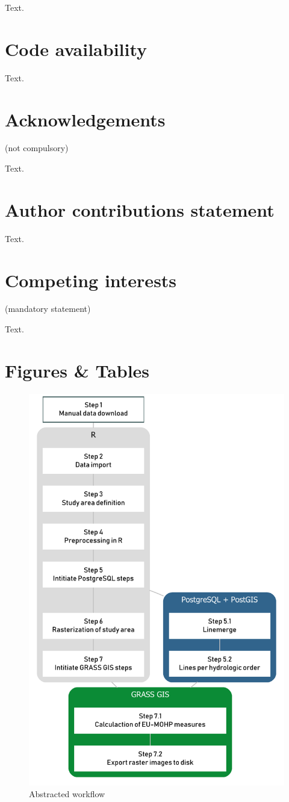 \documentclass[fleqn,10pt]{wlscirep}
\begin{document}
Text.

\section*{Code availability}

Text.






\section*{Acknowledgements} (not compulsory)

Text.

\section*{Author contributions statement}

Text.

\section*{Competing interests} (mandatory statement)

Text.

\section*{Figures \& Tables}

\begin{figure}[ht]
\centering
\includegraphics[width=0.7\linewidth]{"diagramms/flowchart.pdf"}
\caption{Abstracted workflow}
\label{fig:abstracted_workflow}
\end{figure}
\end{document}
